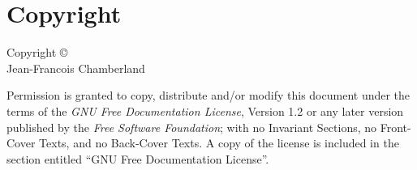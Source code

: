 \documentclass[12pt,openany]{book}
\begin{document}
\frontmatter

\chapter*{Copyright}
Copyright \copyright\ \\
Jean-Francois Chamberland

Permission is granted to copy, distribute and/or modify this document under the terms of the \emph{GNU Free Documentation License}, Version 1.2 or any later version published by the \emph{Free Software Foundation}; with no Invariant Sections, no Front-Cover Texts, and no Back-Cover Texts.
A copy of the license is included in the section entitled ``GNU Free Documentation License''.

\tableofcontents

\mainmatter





%
\end{document}
